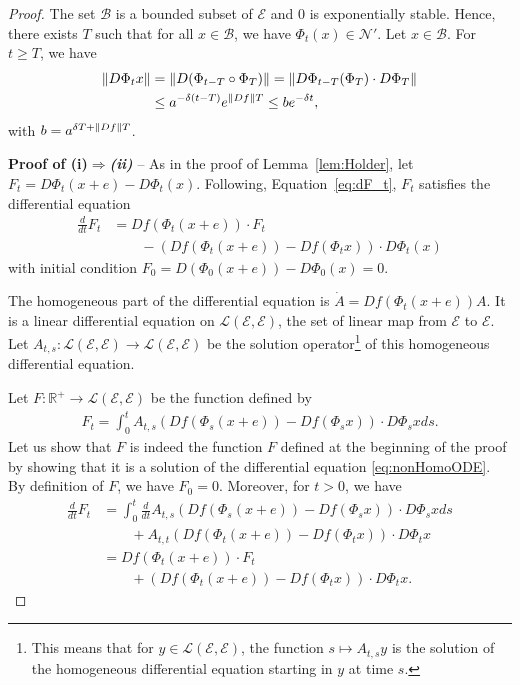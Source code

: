\documentclass[sigconf]{acmart}
\newcommand\E{\mathcal{E}}
\newcommand\R{\mathbb{R}}
\newcommand\calL{\mathcal{L}}
\newcommand\calB{\mathcal{B}}
\newcommand\calN{\mathcal{N}}
\newcommand\norm[1]{{\mathchoice{\bnorm{#1}}{\snorm{#1}}{\snorm{#1}}{\snorm{#1}}}}
\newcommand\bnorm[1]{\left\|#1\right\|}
\newcommand\snorm[1]{\|#1\|}
\newcommand\dt{\frac{d}{dt}}
\newcommand\p[1]{\left(#1\right)}
\begin{document}
\begin{proof}
  The set $\calB$ is a bounded subset of $\E$ and $0$ is exponentially
  stable. Hence, there exists $T$ such that for all $x\in\calB$, we
  have $\Phi_t(x)\in \calN'$.  Let $x\in\calB$. For $t\ge T$, we have
  \begin{align*}
    \norm{D\Phi_tx} &= \norm{ D(\Phi_{t-T}\circ\Phi_{T})}
    =\norm{ D\Phi_{t-T}(\Phi_{T}) \cdot D\Phi_{T}}\\
                    &\le a^{-\delta(t-T)}e^{\norm{Df}T}
    \le b e^{-\delta t},
  \end{align*}
  with $b=a^{\delta T + \norm{Df}T}$.
  
  \textbf{Proof of (i)$\Rightarrow$\emph{(ii)}} -- As in the proof of
  Lemma~\ref{lem:Holder}, let $F_t=D\Phi_t(x+e)-D\Phi_t(x)$.
  Following, Equation~\eqref{eq:dF_t}, $F_t$ satisfies the
  differential equation
  \begin{align}
    \dt F_t &= Df (\Phi_t(x+e))\cdot F_t \nonumber\\
            &\qquad -\p{Df(\Phi_t(x+e))-Df(\Phi_tx)}\cdot D\Phi_t(x)
              \label{eq:nonHomoODE}
  \end{align}
  with initial condition $F_0=D(\Phi_0(x+e))-D\Phi_0(x)=0$. 
  
  The homogeneous part of the differential equation is
  $\dot{A} = Df(\Phi_t(x+e)) A$. It is a linear differential equation
  on $\calL(\E,\E)$, the set of linear map from $\E$ to $\E$. Let
  $A_{t,s}:\calL(\E,\E)\to \calL(\E,\E)$ be the solution
  operator\footnote{This means that for $y\in\calL(\E,\E)$, the
    function $s\mapsto A_{t,s}y$ is the solution of the homogeneous
    differential equation starting in $y$ at time $s$.} of this
  homogeneous differential equation.
  
  Let $F:\R^+\to\calL(\E,\E)$ be the function defined by
  \begin{align*}
    F_t = \int_0^t A_{t,s}\p{Df(\Phi_s(x+e))-Df(\Phi_sx)}\cdot
    D\Phi_sxds.
  \end{align*}
  Let us show that $F$ is indeed the function $F$ defined at the
  beginning of the proof by showing that it is a solution of the
  differential equation \eqref{eq:nonHomoODE}. By definition of $F$,
  we have $F_0=0$. Moreover, for $t>0$, we have 
  \begin{align*}
    \dt F_t &= \int_0^t \dt A_{t,s}\p{Df(\Phi_s(x+e))-Df(\Phi_sx)}\cdot 
              D\Phi_s xds \\
            &\qquad +  A_{t,t} \p{Df(\Phi_t(x+e))-Df(\Phi_tx)}\cdot D\Phi_t x\\
            &= Df(\Phi_t(x+e)) \cdot F_t \\
            &\qquad +  \p{Df(\Phi_t(x+e))-Df(\Phi_tx)}\cdot
              D\Phi_tx. 
  \end{align*}
  

\end{proof}
\end{document}
